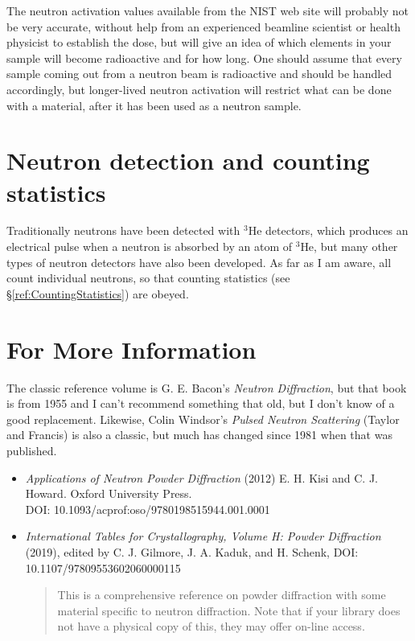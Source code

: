 The neutron activation values available from the NIST web site will probably not be very accurate, without help from an experienced beamline scientist or health physicist to establish the dose, but will give an idea of which elements in your sample will become radioactive and for how long. One should assume that every sample coming out from a neutron beam is radioactive and should be handled accordingly, but longer-lived neutron activation will restrict what can be done with a material, after it has been used as a neutron sample. 

\section{Neutron detection and counting statistics}
Traditionally neutrons have been detected with ${}^3$He detectors, which produces an electrical pulse when a neutron is absorbed by an atom of  ${}^3$He, but many other types of neutron detectors have also been developed. As far as I am aware, all count individual neutrons, so that counting statistics (see \S\ref{ref:CountingStatistics}) are obeyed. 

\section{For More Information}

The classic reference volume is G. E. Bacon's \textit{Neutron Diffraction}, but that book is from 1955 and I can't recommend something that old, but I don't know of a good replacement. Likewise, Colin Windsor's \textit{Pulsed Neutron Scattering} (Taylor and Francis) is also a classic, but much has changed since 1981 when that was published. 

\begin{itemize}
\item 
\textit{Applications of Neutron Powder Diffraction} (2012)
E. H. Kisi and C. J. Howard. Oxford University Press. \\
DOI: 10.1093/acprof:oso/9780198515944.001.0001

\item 
  \textit{International Tables for Crystallography, Volume H: Powder Diffraction} (2019), edited by C. J. Gilmore, J. A. Kaduk, and H. Schenk, DOI: 10.1107/97809553602060000115
  \begin{quote}
This is a comprehensive reference on powder diffraction with some material specific to neutron diffraction. Note that if your library does not have a physical copy of this, they may offer on-line access.
  \end{quote}


\end{itemize}
